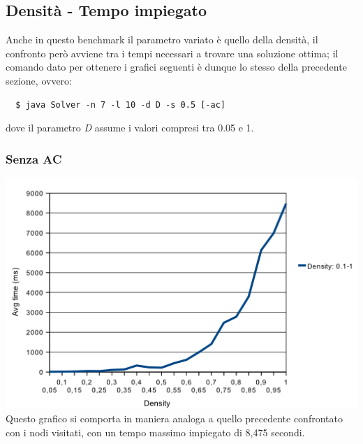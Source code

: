 \documentclass[a4paper,12pt,italian]{article}
\begin{document}
\subsection{Densit\`a - Tempo impiegato}
Anche in questo benchmark il parametro variato \`e quello della
densit\`a, il confronto per\`o avviene tra i tempi necessari a trovare
una soluzione ottima; il comando dato per ottenere i grafici seguenti
\`e dunque lo stesso della precedente sezione, ovvero:
\begin{verbatim}
  $ java Solver -n 7 -l 10 -d D -s 0.5 [-ac]
\end{verbatim}
dove il parametro \textit{D} assume i valori compresi tra 0.05 e 1.

\subsubsection{Senza AC}
\includegraphics[scale=0.8]{densTime.png}
\\
Questo grafico si comporta in maniera analoga a quello precedente confrontato con i nodi visitati,
con un tempo massimo impiegato di 8,475 secondi.
\end{document}
